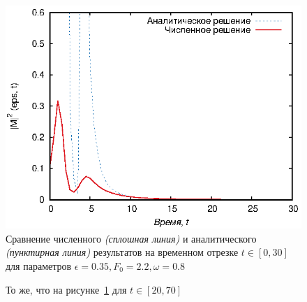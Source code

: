 \documentclass[14pt, a4paper]{article}
\numberwithin{figure}{section}
\numberwithin{equation}{section}
\begin{document}
\begin{figure}[h]
	\begin{center}
			\includegraphics[width=1\linewidth]{full2}
			\caption{Сравнение численного \textit{(сплошная линия)} и аналитического \textit{(пунктирная линия)} результатов на временном отрезке $t\in[0, 30]$ для параметров $\epsilon = 0.35, F_0 = 2.2, \omega = 0.8$} %
			\label{ris:full2} %
	\end{center}
\end{figure}

\begin{figure}[h]
	\caption{То же, что на рисунке~\ref{ris:full2} для $t\in[20, 70]$}
	\label{ris:end2}
\end{figure}
\end{document}
